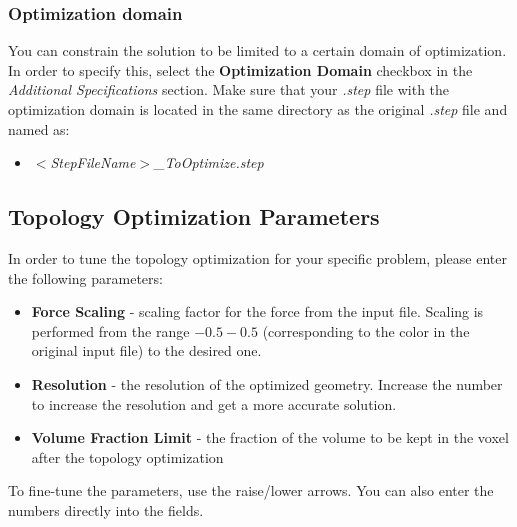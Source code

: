\documentclass[
12pt, %
a4paper, %
oneside, %
headinclude,footinclude, %
BCOR5mm, %
]{scrartcl}
\begin{document}
\subsubsection{Optimization domain}
You can constrain the solution to be limited to a certain domain of optimization. In order to specify this, select the \textbf{Optimization Domain} checkbox in the \textit{Additional Specifications} section. Make sure that your \textit{.step} file with the optimization domain is located in the same directory as the original \textit{.step} file and named as:
\begin{itemize}
\item[] \textit{$<$StepFileName$>${\_}ToOptimize.step}
\end{itemize}


\subsection{Topology Optimization Parameters}
In order to tune the topology optimization for your specific problem, please enter the following parameters:
\begin{itemize}
\item \textbf{Force Scaling} - scaling factor for the force from the input file. Scaling is performed from the range $-0.5 - 0.5$ (corresponding to the color in the original input file) to the desired one.
\item \textbf{Resolution} - the resolution of the optimized geometry. Increase the number to increase the resolution and get a more accurate solution.
\item \textbf{Volume Fraction Limit} - the fraction of the volume to be kept in the voxel after the topology optimization
\end{itemize}

To fine-tune the parameters, use the raise/lower arrows. You can also enter the numbers directly into the fields.
\end{document}

